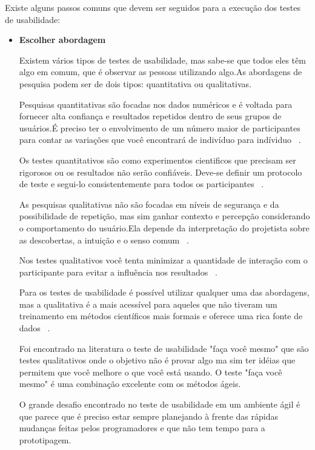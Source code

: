 	Existe alguns passos comuns que devem ser seguidos para a execução dos testes de usabilidade:

\begin{itemize}

\item \textbf{Escolher abordagem}

	Existem vários tipos de testes de usabilidade, mas sabe-se que todos eles têm algo em comum, que é observar as pessoas utilizando algo.As abordagens de pesquisa podem ser de dois tipos: quantitativa ou qualitativas. 

	Pesquisas quantitativas são focadas nos dados numéricos e é voltada para fornecer alta confiança e resultados repetidos dentro de seus grupos de usuários.É preciso ter o envolvimento de um número maior de participantes para contar as variações que você encontrará de indivíduo para indíviduo ~\cite{unger2009}.

	Os testes quantitativos são como experimentos cientificos que precisam ser rigorosos ou os resultados não serão confiáveis. Deve-se definir um protocolo de teste e segui-lo consistentemente para todos os participantes ~\cite{krug2010}.

	As pesquisas qualitativas não são focadas em níveis de segurança e da possibilidade de repetição, mas sim ganhar contexto e percepção considerando o comportamento do usuário.Ela depende da interpretação do projetista sobre as descobertas, a intuição e o senso comum ~\cite{unger2009}.

	Nos testes qualitativos você tenta minimizar a quantidade de interação com o participante para evitar a influência nos resultados ~\cite{krug2010}.

	Para os testes de usabilidade é possível utilizar qualquer uma das abordagens, mas a qualitativa é a mais acessível para aqueles que não tiveram um treinamento em métodos científicos mais formais e oferece uma rica fonte de dados ~\cite{unger2009}.

	Foi encontrado na literatura o teste de usabilidade "faça você mesmo"  que são testes qualitativos onde o objetivo não é provar algo ma sim ter idéias que permitem que você melhore o que você está usando. O teste "faça você mesmo" é uma combinação excelente com os métodos ágeis. 

	O grande desafio encontrado no teste de usabilidade em um ambiente ágil é que parece que é preciso estar sempre planejando à frente das rápidas mudanças feitas pelos programadores e que não tem tempo para a prototipagem.



\end{itemize}
